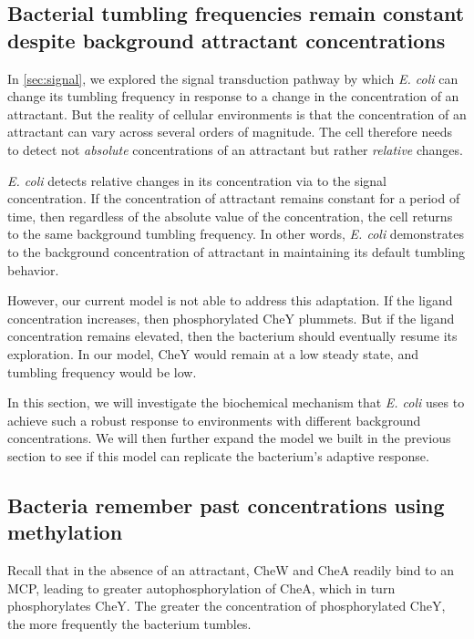 \subsection{Bacterial tumbling frequencies remain constant despite background attractant concentrations}


In \autoref{sec:signal}, we explored the signal transduction pathway by which \textit{E. coli} can change its tumbling frequency in response to a change in the concentration of an attractant. But the reality of cellular environments is that the concentration of an attractant can vary across several orders of magnitude. The cell therefore needs to detect not \textit{absolute} concentrations of an attractant but rather \textit{relative} changes.

\textit{E. coli} detects relative changes in its concentration via  to the signal concentration. If the concentration of attractant remains constant for a period of time, then regardless of the absolute value of the concentration, the cell returns to the same background tumbling frequency. In other words, \textit{E. coli} demonstrates  to the background concentration of attractant in maintaining its default tumbling behavior.

However, our current model is not able to address this adaptation. If the ligand concentration increases, then phosphorylated CheY plummets. But if the ligand concentration remains elevated, then the bacterium should eventually resume its exploration. In our model, CheY would remain at a low steady state, and tumbling frequency would be low.

In this section, we will investigate the biochemical mechanism that \textit{E. coli} uses to achieve such a robust response to environments with different background concentrations. We will then further expand the model we built in the previous section to see if this model can replicate the bacterium's adaptive response.

\FloatBarrier
{}
\subsection{Bacteria remember past concentrations using methylation}

Recall that in the absence of an attractant, CheW and CheA readily bind to an MCP, leading to greater autophosphorylation of CheA, which in turn phosphorylates CheY. The greater the concentration of phosphorylated CheY, the more frequently the bacterium tumbles.

